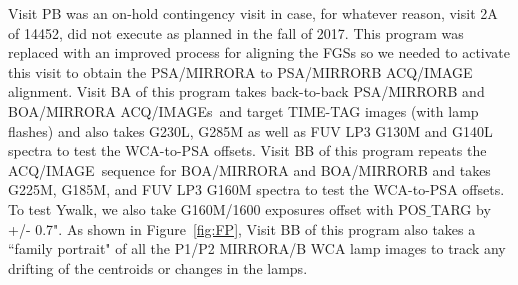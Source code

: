 \documentclass[12pt]{reportj}
\newcommand*{\myfont}{\fontfamily{rm}\selectfont}
\def\acqimage{{\myfont ACQ/IMAGE}\rm}
\def\acqimages{{\myfont ACQ/IMAGE{\rm s}}\rm}
\begin{document}
Visit PB was an on-hold contingency visit in case, for whatever reason, visit 2A of 14452, did not execute as planned in the fall of 2017. This program was replaced with an improved process for aligning the FGSs so we needed to activate this visit to obtain the PSA/MIRRORA to PSA/MIRRORB \acqimage~ alignment.
Visit BA of this program takes back-to-back PSA/MIRRORB and  BOA/MIRRORA \acqimages~and target TIME-TAG images (with lamp flashes) and also takes G230L, G285M as well as FUV LP3 G130M and G140L spectra to test the WCA-to-PSA offsets.
Visit BB of this program repeats the \acqimage~sequence for BOA/MIRRORA and BOA/MIRRORB and takes G225M, G185M, and FUV LP3 G160M spectra to test the WCA-to-PSA offsets. To test Ywalk, we also take G160M/1600 exposures offset with {POS$\_$TARG} by +/- 0.7".
As shown in Figure~\ref{fig:FP}, Visit BB of this program also takes a ``family portrait" of all the P1/P2 MIRRORA/B WCA lamp images to track any drifting of the centroids or changes in the lamps.
\end{document}

